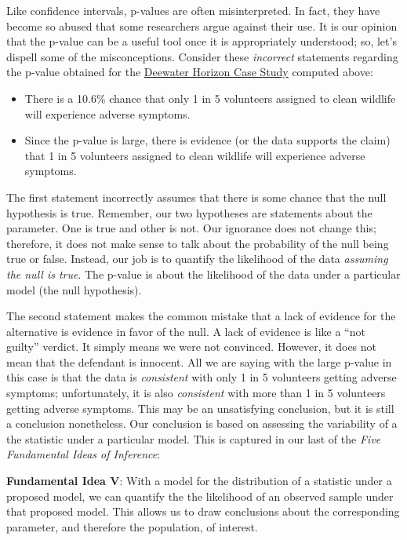 \documentclass[
]{book}
\providecommand{\tightlist}{%
  \setlength{\itemsep}{0pt}\setlength{\parskip}{0pt}}
\theoremstyle{plain}
\theoremstyle{mydefn}
\theoremstyle{myexmpl}
\theoremstyle{remark}
\begin{document}
Like confidence intervals, p-values are often misinterpreted. In fact, they have become so abused that some researchers argue against their use. It is our opinion that the p-value can be a useful tool once it is appropriately understood; so, let's dispell some of the misconceptions. Consider these \emph{incorrect} statements regarding the p-value obtained for the \protect\hyperlink{CaseDeepwater}{Deewater Horizon Case Study} computed above:

\begin{itemize}
\tightlist
\item
  There is a 10.6\% chance that only 1 in 5 volunteers assigned to clean wildlife will experience adverse symptoms.
\item
  Since the p-value is large, there is evidence (or the data supports the claim) that 1 in 5 volunteers assigned to clean wildlife will experience adverse symptoms.
\end{itemize}

The first statement incorrectly assumes that there is some chance that the null hypothesis is true. Remember, our two hypotheses are statements about the parameter. One is true and other is not. Our ignorance does not change this; therefore, it does not make sense to talk about the probability of the null being true or false. Instead, our job is to quantify the likelihood of the data \emph{assuming the null is true}. The p-value is about the likelihood of the data under a particular model (the null hypothesis).

The second statement makes the common mistake that a lack of evidence for the alternative is evidence in favor of the null. A lack of evidence is like a ``not guilty'' verdict. It simply means we were not convinced. However, it does not mean that the defendant is innocent. All we are saying with the large p-value in this case is that the data is \emph{consistent} with only 1 in 5 volunteers getting adverse symptoms; unfortunately, it is also \emph{consistent} with more than 1 in 5 volunteers getting adverse symptoms. This may be an unsatisfying conclusion, but it is still a conclusion nonetheless. Our conclusion is based on assessing the variability of a the statistic under a particular model. This is captured in our last of the \emph{Five Fundamental Ideas of Inference}:

\begin{rmdfivefund}
\textbf{Fundamental Idea V}: With a model for the distribution of a statistic under a proposed model, we can quantify the the likelihood of an observed sample under that proposed model. This allows us to draw conclusions about the corresponding parameter, and therefore the population, of interest.
\end{rmdfivefund}
\end{document}
